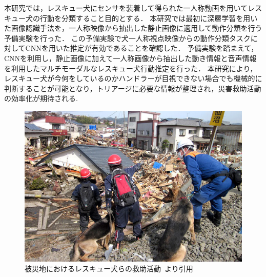本研究では，レスキュー犬にセンサを装着して得られた一人称動画を用いてレスキュー犬の行動を分類すること目的とする．
本研究では最初に深層学習を用いた画像認識手法を，一人称映像から抽出した静止画像に適用して動作分類を行う予備実験を行った．
この予備実験で犬一人称視点映像からの動作分類タスクに対してCNNを用いた推定が有効であることを確認した．
予備実験を踏まえて，CNNを利用し，静止画像に加えて一人称画像から抽出した動き情報と音声情報を利用したマルチモーダルなレスキュー犬行動推定を行った．
本研究により，レスキュー犬が今何をしているのかハンドラーが目視できない場合でも機械的に判断することが可能となり，トリアージに必要な情報が整理され，災害救助活動の効率化が期待される.
\begin{figure}[htbp]
 \begin{center}
  \includegraphics[width=12cm]{./Figures/resque.eps}
  \caption{被災地におけるレスキュー犬らの救助活動~\cite{buycott}より引用}
  \label{resque}
 \end{center}
\end{figure}
